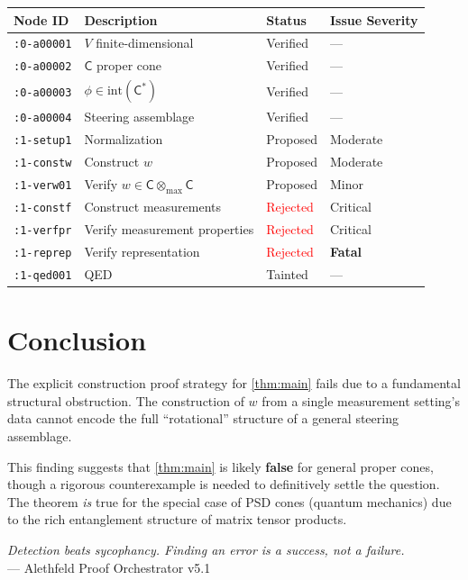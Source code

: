 \documentclass[11pt,a4paper]{article}
\theoremstyle{definition}
\newcommand{\C}{\mathsf{C}}
\newcommand{\Cstar}{\mathsf{C}^*}
\newcommand{\tmax}{\otimes_{\max}}
\newcommand{\interior}{\mathrm{int}}
\begin{document}
\begin{center}
\begin{tabular}{llll}
\toprule
\textbf{Node ID} & \textbf{Description} & \textbf{Status} & \textbf{Issue Severity} \\
\midrule
\texttt{:0-a00001} & $V$ finite-dimensional & Verified & --- \\
\texttt{:0-a00002} & $\C$ proper cone & Verified & --- \\
\texttt{:0-a00003} & $\phi \in \interior(\Cstar)$ & Verified & --- \\
\texttt{:0-a00004} & Steering assemblage & Verified & --- \\
\texttt{:1-setup1} & Normalization & Proposed & Moderate \\
\texttt{:1-constw} & Construct $w$ & Proposed & Moderate \\
\texttt{:1-verw01} & Verify $w \in \C \tmax \C$ & Proposed & Minor \\
\texttt{:1-constf} & Construct measurements & \textcolor{red}{Rejected} & Critical \\
\texttt{:1-verfpr} & Verify measurement properties & \textcolor{red}{Rejected} & Critical \\
\texttt{:1-reprep} & Verify representation & \textcolor{red}{Rejected} & \textbf{Fatal} \\
\texttt{:1-qed001} & QED & Tainted & --- \\
\bottomrule
\end{tabular}
\end{center}

\section{Conclusion}

The explicit construction proof strategy for \cref{thm:main} fails due to a fundamental structural obstruction. The construction of $w$ from a single measurement setting's data cannot encode the full ``rotational'' structure of a general steering assemblage.

This finding suggests that \cref{thm:main} is likely \textbf{false} for general proper cones, though a rigorous counterexample is needed to definitively settle the question. The theorem \emph{is} true for the special case of PSD cones (quantum mechanics) due to the rich entanglement structure of matrix tensor products.

\vspace{1em}
\begin{center}
\textit{Detection beats sycophancy. Finding an error is a success, not a failure.}\\
--- Alethfeld Proof Orchestrator v5.1
\end{center}
\end{document}
